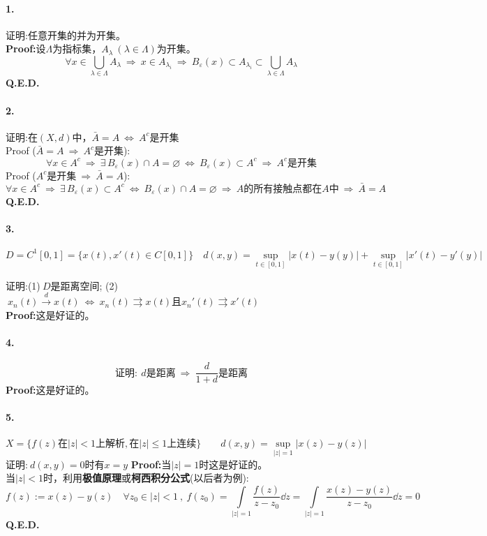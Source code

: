 \paragraph*{1.}证明:任意开集的并为开集。\\
\textbf{Proof:}设$\Lambda$为指标集，$A_{\lambda} \ (\lambda \in \Lambda)$为开集。
\[\forall x \in \bigcup_{\lambda \in \Lambda}A_{\lambda} \ \Rightarrow \ x \in A_{\lambda_i} \ \Rightarrow \ B_{\varepsilon}(x) \subset A_{\lambda_i} \subset \bigcup_{\lambda \in \Lambda}A_{\lambda}\]
\textbf{Q.E.D.}

\paragraph*{2.}证明:在$(X,d)$中，$\bar{A}=A \ \Leftrightarrow \ A^c$是开集\\
Proof ($\bar{A}=A \ \Rightarrow \ A^c$是开集):
\[\forall x \in A^c \ \Rightarrow \ \exists \, B_{\varepsilon}(x) \cap A=\varnothing \ \Leftrightarrow \ B_{\varepsilon}(x) \subset A^c \ \Rightarrow \ A^c\text{是开集}\]
Proof ($A^c$是开集$ \ \Rightarrow \ \bar{A}=A$):
\[\forall x \in A^c \ \Rightarrow \ \exists \, B_{\varepsilon}(x) \subset A^c \ \Leftrightarrow \ B_{\varepsilon}(x) \cap A=\varnothing \ \Rightarrow \ A\text{的所有接触点都在$A$中} \ \Rightarrow \ \bar{A}=A\]
\textbf{Q.E.D.}

\paragraph*{3.}
\[D=C^1[0,1]=\{x(t),x'(t) \in C[0,1]\} \quad d(x,y)=\mathop \text{sup}\limits_{t \in [0,1]}|x(t)-y(y)|+\mathop \text{sup}\limits_{t \in [0,1]}|x'(t)-y'(y)|\]

证明:(1)$\ D$是距离空间; \quad (2)$\ x_n(t) \xrightarrow{d} x(t) \ \Leftrightarrow \ x_n(t) \rightrightarrows x(t)\text{且}x_n'(t) \rightrightarrows x'(t)$\\
\textbf{Proof:}这是好证的。

\paragraph*{4.}
\[\text{证明}: \ d\text{是距离} \ \Rightarrow \ \frac{d}{1+d}\text{是距离}\]
\textbf{Proof:}这是好证的。

\paragraph*{5.}
\[X=\{f(z)\text{在}|z|<1\text{上解析},\text{在}|z| \leq 1\text{上连续}\} \qquad d(x,y)=\mathop \text{sup}\limits_{|z|=1}|x(z)-y(z)|\]
证明:$\ d(x,y)=0$时有$x=y$
\textbf{Proof:}当$|z|=1$时这是好证的。\\
当$|z|<1$时，利用\textbf{极值原理}或\textbf{柯西积分公式}(以后者为例):
\[f(z):=x(z)-y(z) \quad \forall z_0 \in |z|<1 \ , \ f(z_0)=\int\limits_{|z|=1}\frac{f(z)}{z-z_0}\dd z=\int\limits_{|z|=1}\frac{x(z)-y(z)}{z-z_0}\dd z=0\]
\textbf{Q.E.D.}

